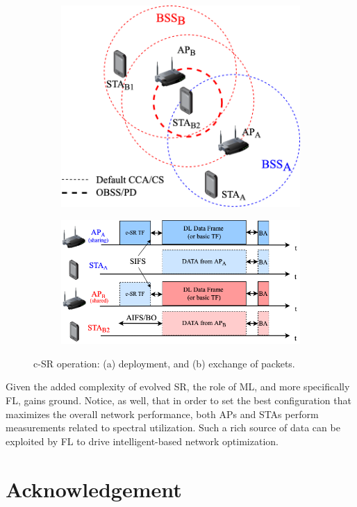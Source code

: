 \documentclass[10pt,a4paper,twocolumn]{article}
\def\startfigure{\vspace{6pt}\begin{figure}[ht]\center}
\begin{document}
\startfigure
\begin{subfigure}[b]{\linewidth}
	\centering
	\includegraphics[width=.65\textwidth]{img/csr_1}
	\caption{}
	\label{fig:csr_1}
\end{subfigure}
\begin{subfigure}[b]{\linewidth}
	\centering
	\includegraphics[width=.75\textwidth]{img/csr_2}
	\caption{}
	\label{fig:csr_2}
\end{subfigure}
\caption{c-SR operation: (a) deployment, and (b) exchange of packets.}\label{fig:csr} 
\end{figure}

Given the added complexity of evolved SR, the role of ML, and more specifically FL, gains ground. Notice, as well, that in order to set the best configuration that maximizes the overall network performance, both APs and STAs perform measurements related to spectral utilization. Such a rich source of data can be exploited by FL to drive intelligent-based network optimization.


\section*{Acknowledgement}
\label{sec:ackn}
\end{document}
